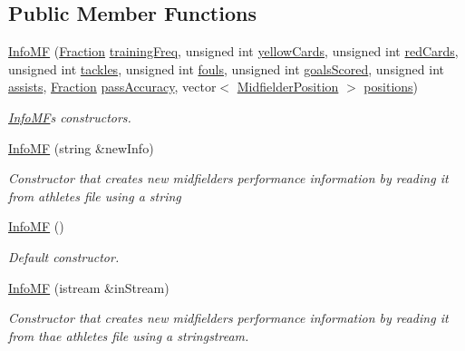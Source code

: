 \subsection*{Public Member Functions}
\begin{DoxyCompactItemize}
\item 
\hyperlink{class_info_m_f_ab5ee5aa88e26c288415c6f29545e0279}{Info\+MF} (\hyperlink{class_fraction}{Fraction} \hyperlink{class_info_ae893be5aad319de5d911c3f80cc0a2d4}{training\+Freq}, unsigned int \hyperlink{class_info_aabdfdb282f3ceaae1772574bf2b3cd86}{yellow\+Cards}, unsigned int \hyperlink{class_info_a953c30accc7e6ff301542adfd5824f38}{red\+Cards}, unsigned int \hyperlink{class_info_aecdd57d96490b16a0c2590dd8f34009e}{tackles}, unsigned int \hyperlink{class_info_a2f90c84ba67c0e225dd58cdc14ab7f3d}{fouls}, unsigned int \hyperlink{class_info_a5ad5f72833856502b9c1f6ea50a98619}{goals\+Scored}, unsigned int \hyperlink{class_info_a1c0340af11df3407946b0ffdaae28864}{assists}, \hyperlink{class_fraction}{Fraction} \hyperlink{class_info_a37ee53dc8ae9a9656206e7eb389c6392}{pass\+Accuracy}, vector$<$ \hyperlink{_utils_8hpp_a9f9328fe291d23e820ad594679abd217}{Midfielder\+Position} $>$ \hyperlink{class_info_m_f_ac0ef77d22b8f5c008b8f66034ad0bd81}{positions})
\begin{DoxyCompactList}\small\item\em \hyperlink{class_info_m_f}{Info\+MF}\textquotesingle{}s constructors. \end{DoxyCompactList}\item 
\hyperlink{class_info_m_f_a3b9abc88e1fd6dc2496f3bfec1715735}{Info\+MF} (string \&new\+Info)
\begin{DoxyCompactList}\small\item\em Constructor that creates new midfielder\textquotesingle{}s performance information by reading it from athletes file using a string \end{DoxyCompactList}\item 
\hyperlink{class_info_m_f_af12fdf83050564420b270599b2d8612b}{Info\+MF} ()
\begin{DoxyCompactList}\small\item\em Default constructor. \end{DoxyCompactList}\item 
\hyperlink{class_info_m_f_a30dc23356ceb270ca5ca5f7f2a943245}{Info\+MF} (istream \&in\+Stream)
\begin{DoxyCompactList}\small\item\em Constructor that creates new midfielder\textquotesingle{}s performance information by reading it from thae athletes file using a stringstream. \end{DoxyCompactList}\item 

\end{DoxyCompactItemize}
